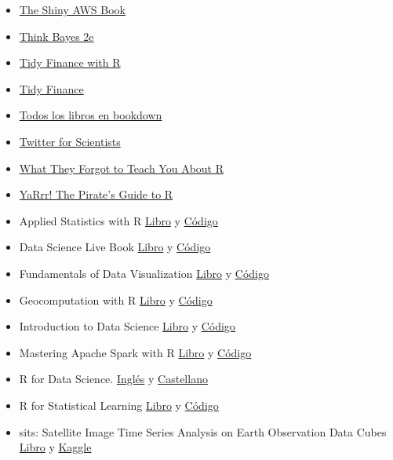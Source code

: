 \documentclass[
]{article}
\begin{document}
\begin{itemize}
{  R Book}
\item
  \href{https://business-science.github.io/shiny-production-with-aws-book/}{The
  Shiny AWS Book}
\item
  \href{https://github.com/AllenDowney/ThinkBayes2}{Think Bayes 2e}
\item
  \href{https://tidy-finance.org/}{Tidy Finance with R}
\item
  \href{https://www.tidy-finance.org/}{Tidy Finance}
\item
  \href{https://bookdown.org/home/archive/}{Todos los libros en
  bookdown}
\item
  \href{https://t4scientists.com/}{Twitter for Scientists}
\item
  \href{https://whattheyforgot.org/}{What They Forgot to Teach You About
  R}
\item
  \href{https://bookdown.org/ndphillips/YaRrr/}{YaRrr! The Pirate's
  Guide to R}
\item
  Applied Statistics with R
  \href{https://daviddalpiaz.github.io/appliedstats/}{Libro} y
  \href{https://github.com/daviddalpiaz/appliedstats}{Código}
\item
  Data Science Live Book
  \href{https://livebook.datascienceheroes.com/}{Libro} y
  \href{https://github.com/pablo14/data-science-live-book}{Código}
\item
  Fundamentals of Data Visualization
  \href{https://clauswilke.com/dataviz/}{Libro} y
  \href{https://github.com/clauswilke/dataviz}{Código}
\item
  Geocomputation with R
  \href{https://geocompr.robinlovelace.net/}{Libro} y
  \href{https://github.com/Robinlovelace/geocompr/}{Código}
\item
  Introduction to Data Science
  \href{https://rafalab.github.io/dsbook/}{Libro} y
  \href{https://github.com/rafalab/dsbook}{Código}
\item
  Mastering Apache Spark with R
  \href{https://therinspark.com/intro.html}{Libro} y
  \href{https://github.com/r-spark/the-r-in-spark}{Código}
\item
  R for Data Science. \href{https://r4ds.hadley.nz/}{Inglés} y
  \href{https://es.r4ds.hadley.nz/}{Castellano}
\item
  R for Statistical Learning
  \href{https://daviddalpiaz.github.io/r4sl/}{Libro} y
  \href{https://github.com/daviddalpiaz/r4sl}{Código}
\item
  sits: Satellite Image Time Series Analysis on Earth Observation Data
  Cubes \href{https://e-sensing.github.io/sitsbook/index.html}{Libro} y
  \href{https://www.kaggle.com/esensing/code}{Kaggle}
\end{itemize}
\end{document}

